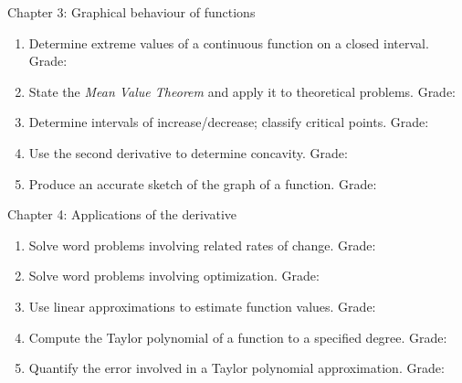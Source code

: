 \documentclass[11pt,letterpaper]{amsart}
\begin{document}
Chapter 3: Graphical behaviour of functions %
\begin{enumerate} 
\item Determine extreme values of a continuous function on a closed interval.\hspace*{\fill} Grade:  \quad {} \quad {}
\item State the \emph{Mean Value Theorem} and apply it to theoretical problems.\hspace*{\fill} Grade:  \quad {} \quad {}
\item Determine intervals of increase/decrease; classify critical points.\hspace*{\fill} Grade:  \quad {} \quad {}
\item Use the second derivative to determine concavity.\hspace*{\fill} Grade:  \quad {} \quad {}
\item Produce an accurate sketch of the graph of a function.\hspace*{\fill} Grade:  \quad {} \quad {}
\end{enumerate}

\bigskip

Chapter 4: Applications of the derivative %
\begin{enumerate}
\item Solve word problems involving related rates of change.\hspace*{\fill} Grade:  \quad {} \quad {}
\item Solve word problems involving optimization.\hspace*{\fill} Grade:  \quad {} \quad {}
\item Use linear approximations to estimate function values.\hspace*{\fill} Grade:  \quad {} \quad {}
\item Compute the Taylor polynomial of a function to a specified degree.\hspace*{\fill} Grade:  \quad {} \quad {}
\item Quantify the error involved in a Taylor polynomial approximation.\hspace*{\fill} Grade:  \quad {} \quad {}
\end{enumerate}
\end{document}
